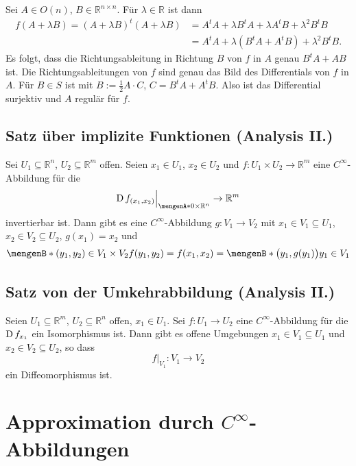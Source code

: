 Sei $A \in O(n)$, $B \in \mathds{R}^{n \times n}$. Für $\lambda  \in \mathds{R}$ ist dann 
\begin{align*}
	f(A+ \lambda B) = (A+ \lambda B)^t (A+ \lambda B) &= A^t A + \lambda B^t A + \lambda A^t B + \lambda^2 B^t B \\ &= A^t A + \lambda (B^t A + A^t B) + \lambda^2 B^t B.
\end{align*}
Es folgt, dass die Richtungsableitung in Richtung $B$ von $f$ in $A$ genau $B^t A + AB$ ist. Die Richtungsableitungen von $f$ sind genau das Bild des Differentials von $f$
in $A$. Für $B \in S$ ist mit $B := \frac{1}{2} A \cdot C $, $C = B^t A + A^t B$. Also ist das Differential surjektiv und $A$ regulär für $f$. \bewende

\subsection{Satz über implizite Funktionen (Analysis II.)} %
\label{sub:169}
Sei $U_1 \subseteq \mathds{R}^n$, $U_2 \subseteq \mathds{R}^m$ offen. Seien $x_1 \in U_1$, $x_2 \in U_2$ und $f : U_1 \times U_2 \to \mathds{R}^m$ eine $C^\infty$-Abbildung
für die
\[
	\D f_{(x_1,x_2)} \Big|_{\set{0} \times \mathds{R}^n } \to \mathds{R}^m
\]
invertierbar ist. Dann gibt es eine $C^\infty$-Abbildung $g : V_1 \to V_2$ mit $x_1 \in V_1 \subseteq U_1$, $x_2 \in V_2 \subseteq U_2$, $g(x_1)=x_2$ und 
\[
	\set[(y_1, y_2) \in V_1 \times V_2]{f(y_1, y_2)= f(x_1,x_2)} = \set[{\enbrace[\big]{y_1, g(y_1)}}]{y_1 \in V_1}  
\]

\subsection{Satz von der Umkehrabbildung (Analysis II.)} %
\label{sub:1610}
Seien $U_1 \subseteq \mathds{R}^m$, $U_2 \subseteq \mathds{R}^n$ offen, $x_1 \in U_1$. Sei $f : U_1 \to U_2$ eine $C^\infty$-Abbildung für die $\operatorname{D} f_{x_1}$ ein 
Isomorphismus ist. Dann gibt es offene Umgebungen $x_1 \in V_1 \subseteq U_1$ und $x_2 \in V_2 \subseteq U_2$, so dass
\[
	f \big|_{V_1} : V_1 \to V_2
\]
ein Diffeomorphismus ist.
\newpage

\section{Approximation durch $C^\infty$-Abbildungen} %
\label{sec:17}

